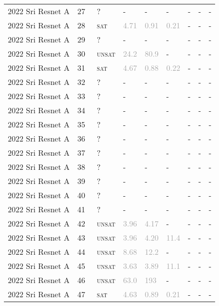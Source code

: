 \begin{center}
{\begin{longtable}{@{}lllllllll@{}}
2022 Sri Resnet A & 27 & ~? & - & - & - & - & - & - \\
2022 Sri Resnet A & 28 & ~\textsc{sat} & \textcolor{darkgray}{4.71} & \textcolor{darkgray}{0.91} & \textcolor{darkgray}{0.21} & - & - & - \\
2022 Sri Resnet A & 29 & ~? & - & - & - & - & - & - \\
2022 Sri Resnet A & 30 & ~\textsc{unsat} & \textcolor{darkgray}{24.2} & \textcolor{darkgray}{80.9} & - & - & - & - \\
2022 Sri Resnet A & 31 & ~\textsc{sat} & \textcolor{darkgray}{4.67} & \textcolor{darkgray}{0.88} & \textcolor{darkgray}{0.22} & - & - & - \\
2022 Sri Resnet A & 32 & ~? & - & - & - & - & - & - \\
2022 Sri Resnet A & 33 & ~? & - & - & - & - & - & - \\
2022 Sri Resnet A & 34 & ~? & - & - & - & - & - & - \\
2022 Sri Resnet A & 35 & ~? & - & - & - & - & - & - \\
2022 Sri Resnet A & 36 & ~? & - & - & - & - & - & - \\
2022 Sri Resnet A & 37 & ~? & - & - & - & - & - & - \\
2022 Sri Resnet A & 38 & ~? & - & - & - & - & - & - \\
2022 Sri Resnet A & 39 & ~? & - & - & - & - & - & - \\
2022 Sri Resnet A & 40 & ~? & - & - & - & - & - & - \\
2022 Sri Resnet A & 41 & ~? & - & - & - & - & - & - \\
2022 Sri Resnet A & 42 & ~\textsc{unsat} & \textcolor{darkgray}{3.96} & \textcolor{darkgray}{4.17} & - & - & - & - \\
2022 Sri Resnet A & 43 & ~\textsc{unsat} & \textcolor{darkgray}{3.96} & \textcolor{darkgray}{4.20} & \textcolor{darkgray}{11.4} & - & - & - \\
2022 Sri Resnet A & 44 & ~\textsc{unsat} & \textcolor{darkgray}{8.68} & \textcolor{darkgray}{12.2} & - & - & - & - \\
2022 Sri Resnet A & 45 & ~\textsc{unsat} & \textcolor{darkgray}{3.63} & \textcolor{darkgray}{3.89} & \textcolor{darkgray}{11.1} & - & - & - \\
2022 Sri Resnet A & 46 & ~\textsc{unsat} & \textcolor{darkgray}{63.0} & \textcolor{darkgray}{193} & - & - & - & - \\
2022 Sri Resnet A & 47 & ~\textsc{sat} & \textcolor{darkgray}{4.63} & \textcolor{darkgray}{0.89} & \textcolor{darkgray}{0.21} & - & - & - \\

\end{longtable}}
\end{center}
